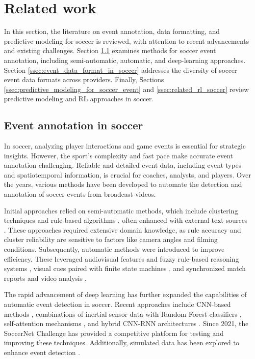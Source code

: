 \section{Related work}
\label{sec:related_work}
In this section, the literature on event annotation, data formatting, and predictive modeling for soccer is reviewed, with attention to recent advancements and existing challenges. Section \ref{ssec:event_annotation_in_soccer} examines methods for soccer event annotation, including semi-automatic, automatic, and deep-learning approaches. Section \ref{ssec:event_data_format_in_soccer} addresses the diversity of soccer event data formats across providers. Finally, Sections \ref{ssec:predictive_modeling_for_soccer_event} and \ref{ssec:related_rl_soccer} review predictive modeling and RL approaches in soccer.



\subsection{Event annotation in soccer}
\label{ssec:event_annotation_in_soccer}

In soccer, analyzing player interactions and game events is essential for strategic insights. However, the sport’s complexity and fast pace make accurate event annotation challenging. Reliable and detailed event data, including event types and spatiotemporal information, is crucial for coaches, analysts, and players. Over the years, various methods have been developed to automate the detection and annotation of soccer events from broadcast videos.

Initial approaches relied on semi-automatic methods, which include clustering techniques \citep{ballan2010semantic} and rule-based algorithms \citep{stein2016director}, often enhanced with external text sources \citep{alan2008ontological}. These approaches required extensive domain knowledge, as rule accuracy and cluster reliability are sensitive to factors like camera angles and filming conditions. Subsequently, automatic methods were introduced to improve efficiency. These leveraged audiovisual features and fuzzy rule-based reasoning systems \citep{hosseini2013fuzzy}, visual cues paired with finite state machines \citep{assfalg2003semantic}, and synchronized match reports and video analysis \citep{wang2016soccer}.

The rapid advancement of deep learning has further expanded the capabilities of automatic event detection in soccer. Recent approaches include CNN-based methods \citep{theagarajan2020automated,cioppa2020context}, combinations of inertial sensor data with Random Forest classifiers \citep{barra2023footapp}, self-attention mechanisms \citep{ma2020event}, and hybrid CNN-RNN architectures \citep{sorano2021automatic}. Since 2021, the SoccerNet Challenge \citep{cioppa2024soccernet2024challengesresults} has provided a competitive platform for testing and improving these techniques. Additionally, simulated data has been explored to enhance event detection \citep{morra2020soccer}.

